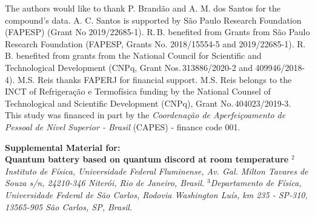 \documentclass[aps,prl,epsfigure,twocolumn,superscriptaddress]{revtex4-1}
\newcommand{\1}{\mathbbm{1}}
\begin{document}
\begin{acknowledgments}
	The authors would like to thank P. Brand\~{a}o and A. M. dos Santos for the compound's data. A. C. Santos is supported by São Paulo Research Foundation (FAPESP) (Grant No 2019/22685-1). R.\,B. benefited from Grants from S\~ao Paulo Research Foundation (FAPESP, Grants No. 2018/15554-5 and 2019/22685-1). R. B. benefited from grants from the National Council for Scientific and Technological Development (CNPq, Grant Nos.\,313886/2020-2 and 409946/2018-4). M.S. Reis thanks FAPERJ for financial support. M.S. Reis belongs to the INCT of Refrigeração e Termofísica funding by the National Counsel of Technological
	and Scientific Development (CNPq), Grant No.\,404023/2019-3. This study was financed in part by the \textit{Coordena\c{c}\~{a}o de Aperfei\c{c}oamento de Pessoal de N\'{i}vel Superior - Brasil} (CAPES) - finance code 001.
\end{acknowledgments}

\newpage

\onecolumngrid

\begin{center}
	{\large{ {\bf Supplemental Material for: \\Quantum battery based on quantum discord at room temperature}}}
	{\em$^{2}$Instituto de F\'{i}sica, Universidade Federal Fluminense, Av. Gal. Milton Tavares de Souza s/n, 24210-346 Niter\'{o}i, Rio de Janeiro, Brasil.}
	{\em$^{3}$Departamento de Física, Universidade Federal de São Carlos, Rodovia Washington Luís, km 235 - SP-310, 13565-905 São Carlos, SP, Brasil.}
\end{center}
\end{document}
